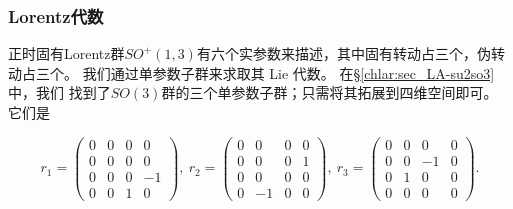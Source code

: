 \subsubsection{Lorentz代数}
正时固有Lorentz群$SO^{+}(1,3)$有六个实参数来描述，其中固有转动占三个，伪转动占三个。
我们通过单参数子群来求取其 Lie 代数。
在\S\ref{chlar:sec_LA-su2so3}中，我们
找到了$SO(3)$群的三个单参数子群；只需将其拓展到四维空间即可。
它们是
\begin{small}
\begin{equation}\label{chlg:eqn_LA-so13-r}
    r_1=\begin{pmatrix}
        0&0&0&0\\
        0&0 & 0 & 0 \\
        0&0& 0 & -1 \\
        0&0 & 1 & 0
    \end{pmatrix},\ 
    r_2=\begin{pmatrix}
        0&0&0&0\\
        0&0 & 0 & 1 \\
        0&0 & 0 & 0 \\
        0&-1 & 0 & 0
    \end{pmatrix},\ 
    r_3=\begin{pmatrix}
        0&0&0&0\\
        0&0 & - 1 & 0 \\
        0&1& 0 & 0 \\
        0&0 & 0 & 0
    \end{pmatrix} .
\end{equation}
\end{small}

